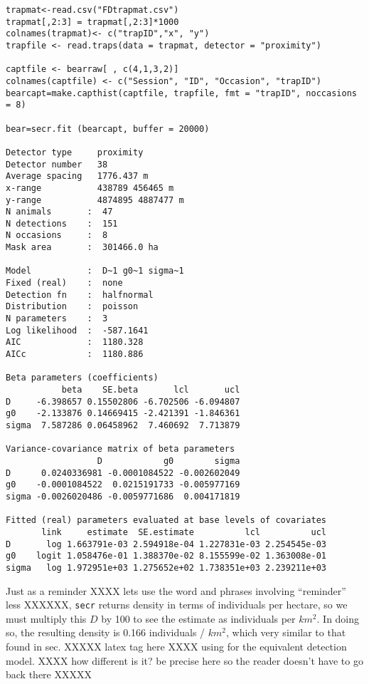 {\small
\begin{verbatim}
trapmat<-read.csv("FDtrapmat.csv")
trapmat[,2:3] = trapmat[,2:3]*1000
colnames(trapmat)<- c("trapID","x", "y")
trapfile <- read.traps(data = trapmat, detector = "proximity")

captfile <- bearraw[ , c(4,1,3,2)] 
colnames(captfile) <- c("Session", "ID", "Occasion", "trapID")
bearcapt=make.capthist(captfile, trapfile, fmt = "trapID", noccasions = 8)

bear=secr.fit (bearcapt, buffer = 20000)

Detector type     proximity 
Detector number   38 
Average spacing   1776.437 m 
x-range           438789 456465 m 
y-range           4874895 4887477 m 
N animals       :  47  
N detections    :  151 
N occasions     :  8 
Mask area       :  301466.0 ha 

Model           :  D~1 g0~1 sigma~1 
Fixed (real)    :  none 
Detection fn    :  halfnormal 
Distribution    :  poisson 
N parameters    :  3 
Log likelihood  :  -587.1641 
AIC             :  1180.328 
AICc            :  1180.886 

Beta parameters (coefficients) 
           beta    SE.beta       lcl       ucl
D     -6.398657 0.15502806 -6.702506 -6.094807
g0    -2.133876 0.14669415 -2.421391 -1.846361
sigma  7.587286 0.06458962  7.460692  7.713879

Variance-covariance matrix of beta parameters 
                  D            g0        sigma
D      0.0240336981 -0.0001084522 -0.002602049
g0    -0.0001084522  0.0215191733 -0.005977169
sigma -0.0026020486 -0.0059771686  0.004171819

Fitted (real) parameters evaluated at base levels of covariates 
       link     estimate  SE.estimate          lcl          ucl
D       log 1.663791e-03 2.594918e-04 1.227831e-03 2.254545e-03
g0    logit 1.058476e-01 1.388370e-02 8.155599e-02 1.363008e-01
sigma   log 1.972951e+03 1.275652e+02 1.738351e+03 2.239211e+03
\end{verbatim}
}



Just as a reminder XXXX lets use the word and phrases involving
``reminder'' less XXXXXX, \mbox{\tt secr} returns density in terms of 
individuals per
hectare, so we must multiply this $D$ by 100 to see the estimate as
individuals per $km^2$.  In doing so, the resulting density is 0.166
individuals / $km^2$, which very similar to that found in sec. XXXXX
latex tag here XXXX
using \winbugs for the equivalent detection model. XXXX how different
is it? be precise here so the reader doesn't have to go back there XXXXX

